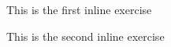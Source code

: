 \documentclass[a4paper]{article}
\begin{document}


\begin{exercise}
This is the first inline exercise
\end{exercise}



\begin{exercise}
This is the second inline exercise
\end{exercise}



\end{document}

